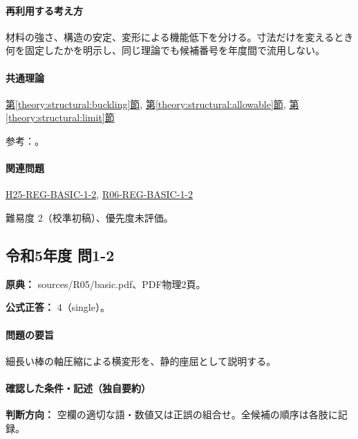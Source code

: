 \paragraph{再利用する考え方} 材料の強さ、構造の安定、変形による機能低下を分ける。寸法だけを変えるとき何を固定したかを明示し、同じ理論でも候補番号を年度間で流用しない。

\paragraph{共通理論} \hyperref[theory:structural:buckling]{第\ref*{theory:structural:buckling}節}, \hyperref[theory:structural:allowable]{第\ref*{theory:structural:allowable}節}, \hyperref[theory:structural:limit]{第\ref*{theory:structural:limit}節}

\par 参考：\cite{struct_mit_beam,struct_mit_buckling,struct_mlit_limit}。

\paragraph{関連問題} \hyperref[q:h25-reg-basic-1-2]{H25-REG-BASIC-1-2}, \hyperref[q:r06-reg-basic-1-2]{R06-REG-BASIC-1-2}

\par 難易度 2（校準初稿）、優先度未評価。

\subsection{令和5年度 問1-2}
\label{q:r05-reg-basic-1-2}

\noindent\textbf{原典：} sources/R05/basic.pdf、PDF物理2頁。

\textbf{公式正答：} 4（single）。

\paragraph{問題の要旨} 細長い棒の軸圧縮による横変形を、静的座屈として説明する。

\paragraph{確認した条件・記述（独自要約）}\mbox{}\par

\noindent\textbf{判断方向：} 空欄の適切な語・数値又は正誤の組合せ。全候補の順序は各肢に記録。\par

